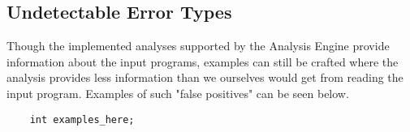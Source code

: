 \subsection{Undetectable Error Types}

Though the implemented analyses supported by the Analysis Engine provide information about the input programs, examples can still be crafted where the analysis provides less information than we ourselves would get from reading the input program. Examples of such "false positives" can be seen below. 

\newpar {}

\begin{verbatim}
    int examples_here;
\end{verbatim}